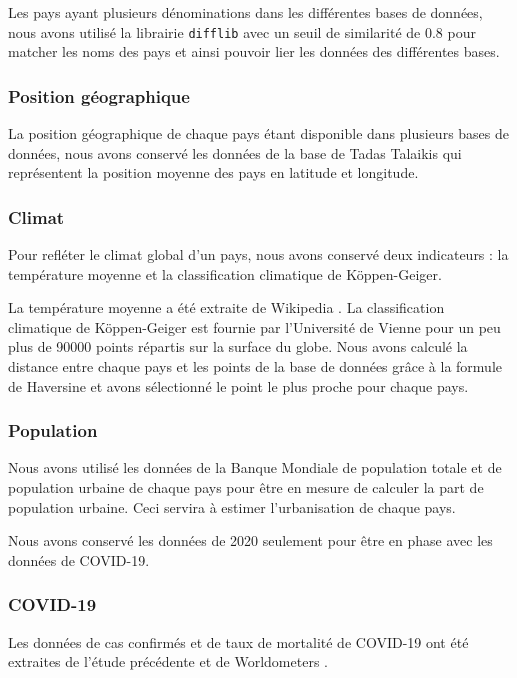 \documentclass[12pt]{iEEEtran}
\begin{document}
Les pays ayant plusieurs dénominations dans les différentes bases de données, nous avons utilisé
la librairie \texttt{difflib} avec un seuil de similarité de 0.8 pour matcher les noms des pays
et ainsi pouvoir lier les données des différentes bases.

\subsubsection{Position géographique}
La position géographique de chaque pays étant disponible dans plusieurs bases de données, nous
avons conservé les données de la base de Tadas Talaikis \cite{country_pos} qui représentent
la position moyenne des pays en latitude et longitude.

\subsubsection{Climat}
Pour refléter le climat global d'un pays, nous avons conservé deux indicateurs : la température
moyenne et la classification climatique de Köppen-Geiger.

La température moyenne a été extraite de Wikipedia \cite{mean_temp}. La classification
climatique de Köppen-Geiger est fournie par l'Université de Vienne \cite{climate_classification}
pour un peu plus de 90000 points répartis sur la surface du globe. Nous avons calculé la distance
entre chaque pays et les points de la base de données grâce à la formule de Haversine
\cite{haversine} et avons sélectionné le point le plus proche pour chaque pays.

\subsubsection{Population}
Nous avons utilisé les données de la Banque Mondiale de population totale \cite{total_pop} et
de population urbaine \cite{urban_pop} de chaque pays pour être en mesure de calculer la part
de population urbaine. Ceci servira à estimer l'urbanisation de chaque pays.

Nous avons conservé les données de 2020 seulement pour être en phase avec les données de COVID-19.

\subsubsection{COVID-19}
Les données de cas confirmés et de taux de mortalité de COVID-19 ont été extraites de l'étude
précédente \cite{kaggle} \cite{mortality_rate} et de Worldometers \cite{mortality_website}.
\end{document}
